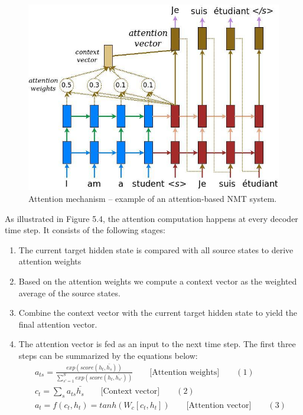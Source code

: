 \documentclass[a4paper,12pt]{report}
\begin{document}
\begin{figure}[H]
\begin{center}
\includegraphics[scale=.3]{attention_mechanism}
\caption{ Attention mechanism – example of an attention-based NMT system.}
\end{center}
\end{figure}
\noindent As illustrated in Figure 5.4, the attention computation happens at every decoder time step. It consists of the following stages:
\begin{enumerate}
\item The current target hidden state is compared with all source states to derive attention weights
\item Based on the attention weights we compute a context vector as the weighted average of the source states.
\item Combine the context vector with the current target hidden state to yield the final attention vector.
\item The attention vector is fed as an input to the next time step. The first three steps can be summarized by the equations below:
\begin{align*}
a_{ts} = \frac{exp(score(h_t, \bar{h_s}))}{\sum_{s'=1}^{S}{exp(score(h_t, \bar{h_{s'}}))}} \qquad\text{[Attention weights]}\qquad(1)\\
c_t = \sum_{s}^{}{a_{ts}\bar{h_s}} \qquad\text{[Context vector]}\qquad(2)\\
a_t = f(c_t, h_t) = tanh(W_c[c_t,h_t]) \qquad\text{[Attention vector]}\qquad(3)
\end{align*}
\end{enumerate}
\end{document}
